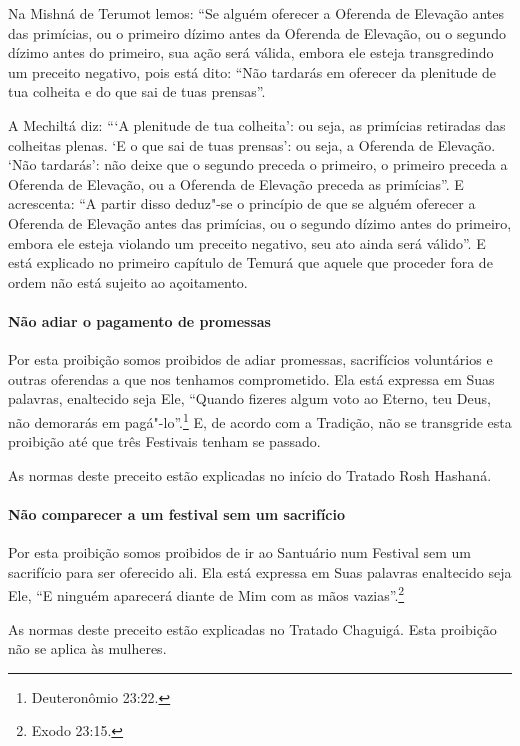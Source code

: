 \begin{multicols}{2}
Na Mishná\starr{} de Terumot\starr{} lemos: ``Se alguém oferecer a Oferenda de Elevação
antes das primícias, ou o primeiro dízimo antes da Oferenda de
Elevação, ou o segundo dízimo antes do primeiro, sua ação será válida,
embora ele esteja transgredindo um preceito negativo, pois está dito:
``Não tardarás em oferecer da plenitude de tua colheita e do que sai de
tuas prensas''.

A Mechiltá\starr{} diz: ```A plenitude de tua colheita': ou seja, as primícias
retiradas das colheitas plenas. `E o que sai de tuas prensas': ou seja,
a Oferenda de Elevação. `Não tardarás': não deixe que o segundo preceda
o primeiro, o primeiro preceda a Oferenda de Elevação, ou a Oferenda de
Elevação preceda as primícias''. E acrescenta: ``A partir disso deduz"-se
o princípio de que se alguém oferecer a Oferenda de Elevação antes das
primícias, ou o segundo dízimo antes do primeiro, embora ele esteja
violando um preceito negativo, seu ato ainda será válido''. E está
explicado no primeiro capítulo de Temurá\starr{} que aquele que proceder fora de
ordem não está sujeito ao açoitamento.

\paragraph{Não adiar o pagamento de promessas}

Por esta proibição somos proibidos de adiar promessas, sacrifícios
voluntários e outras oferendas a que nos tenhamos comprometido. Ela está
expressa em Suas palavras, enaltecido seja Ele, ``Quando fizeres algum
voto ao Eterno, teu Deus, não demorarás em pagá"-lo''.\footnote{Deuteronômio 23:22.} E, de acordo com a Tradição, não se transgride
esta proibição até que três Festivais tenham se passado.

As normas deste preceito estão explicadas no início do Tratado Rosh Hashaná\starr.

\paragraph{Não comparecer a um festival sem um sacrifício}

Por esta proibição somos proibidos de ir ao Santuário num Festival sem
um sacrifício para ser oferecido ali. Ela está expressa em Suas palavras
enaltecido seja Ele, ``E ninguém aparecerá diante de Mim com as mãos
vazias''.\footnote{Exodo 23:15.}

As normas deste preceito estão explicadas no Tratado Chaguigá\starr. Esta
proibição não se aplica às mulheres.


\end{multicols}
